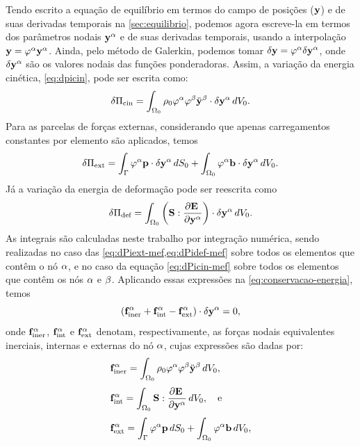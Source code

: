 \documentclass[Tese.tex]{subfiles}
\begin{document}
Tendo escrito a equação de equilíbrio em termos do campo de posições ($\mathbf{y}$) e de suas derivadas temporais na \autoref{sec:equilibrio}, podemos agora escreve-la em termos dos parâmetros nodais $\mathbf{y}^\alpha$ e de suas derivadas temporais, usando a interpolação $\mathbf{y}=\varphi^\alpha\mathbf{y}^\alpha$. Ainda, pelo método de Galerkin, podemos tomar $\delta\mathbf{y} = \varphi^\alpha\delta\mathbf{y}^\alpha$, onde $\delta\mathbf{y}^\alpha$ são os valores nodais das funções ponderadoras. Assim, a variação da energia cinética, \cref{eq:dpicin}, pode ser escrita como:
\begin{equation}\label{eq:dPicin-mef}
\delta\Pi_\text{cin} = \int_{\Omega_0}\rho_0\varphi^\alpha\varphi^\beta\ddot{\mathbf{y}}^\beta\cdot\delta\mathbf{y}^\alpha\,dV_0 .
\end{equation}
Para as parcelas de forças externas, considerando que apenas carregamentos constantes por elemento são aplicados, temos
\begin{equation}\label{eq:dPiext-mef}
\delta\Pi_\text{ext} = \int_{\Gamma}\varphi^\alpha\mathbf{p}\cdot\delta\mathbf{y}^\alpha\,dS_0 + \int_{\Omega_0}\varphi^\alpha\mathbf{b}\cdot\delta\mathbf{y}^\alpha\,dV_0 .
\end{equation}
Já a variação da energia de deformação pode ser reescrita como
\begin{equation}\label{eq:dPidef-mef}
\delta\Pi_\text{def} = \int_{\Omega_0}\left(\mathbf{S}:\dfrac{\partial\mathbf{E}_{\;}}{\partial\mathbf{y}^\alpha}\right)\cdot\delta\mathbf{y}^\alpha\,dV_0.
\end{equation}
As integrais são calculadas neste trabalho por integração numérica, sendo realizadas no caso das \cref{eq:dPiext-mef,eq:dPidef-mef} sobre todos os elementos que contêm o nó $\alpha$, e no caso da equação \cref{eq:dPicin-mef} sobre todos os elementos que contêm os nós $\alpha$ e $\beta$. Aplicando essas expressões na \cref{eq:conservacao-energia}, temos
\begin{equation}\label{eq:equilibrio-mef-0}
\left(\mathbf{f}_\text{iner}^\alpha + \mathbf{f}_\text{int}^\alpha - \mathbf{f}_\text{ext}^\alpha \right)\cdot \delta\mathbf{y}^\alpha = 0,
\end{equation}
onde $\mathbf{f}_\text{iner}^\alpha$, $\mathbf{f}_\text{int}^\alpha$ e $\mathbf{f}_\text{ext}^\alpha$ denotam, respectivamente, as forças nodais equivalentes inerciais, internas e externas do nó $\alpha$, cujas expressões são dadas por:
\begin{align}
&\mathbf{f}_\text{iner}^\alpha = \int_{\Omega_0}\rho_0\varphi^\alpha\varphi^\beta\ddot{\mathbf{y}}^\beta\,dV_0 ,\label{eq:finer}\\[0.1cm]
&\mathbf{f}_\text{int}^\alpha = \int_{\Omega_0}\mathbf{S}:\dfrac{\partial\mathbf{E}_{\;}}{\partial\mathbf{y}^\alpha}\,dV_0 ,\text{\quad e}\label{eq:fint}\\[0.1cm]
&\mathbf{f}_\text{ext}^\alpha = \int_{\Gamma}\varphi^\alpha\mathbf{p}\,dS_0 + \int_{\Omega_0}\varphi^\alpha\mathbf{b}\,dV_0,\label{eq:fext}
\end{align}
\end{document}
